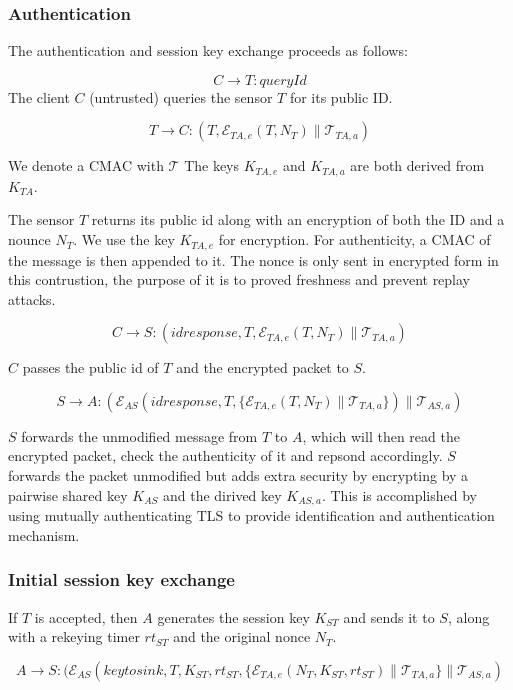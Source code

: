 \subsubsection{Authentication}

The authentication and session key exchange proceeds as follows:

\[
C \rightarrow T: \textit{queryId}
\]
The client $C$ (untrusted) queries the sensor $T$ for its public ID.


\[
T \rightarrow C: (T, \mathcal{E}_{TA,e}(T, N_T) \parallel \mathcal{T}_{TA,a})
\]

We denote a CMAC with $\mathcal{T}$ The keys $K_{TA,e}$ and $K_{TA,a}$
are both derived from $K_{TA}$.

The sensor $T$ returns its public id along with an encryption of both
the ID and a nounce $N_T$. We use the key $K_{TA,e}$ for
encryption. For authenticity, a CMAC of the message is then appended
to it. The nonce is only sent in encrypted form in this contrustion,
the purpose of it is to proved freshness and prevent replay attacks.

\[
C\rightarrow S: (idresponse,T,\mathcal{E}_{TA,e}(T,N_T) \parallel \mathcal{T}_{TA,a})
\]

$C$ passes the public id of $T$ and the encrypted packet to $S$.

\[
S \rightarrow A: (\mathcal{E}_{AS}(idresponse,T, \{
\mathcal{E}_{TA,e}(T,N_T) \parallel \mathcal{T}_{TA,a} \}) \parallel
\mathcal{T}_{AS,a})
\]

$S$ forwards the unmodified message from $T$ to $A$, which will then
read the encrypted packet, check the authenticity of it and repsond
accordingly. $S$ forwards the packet unmodified but adds extra security
by encrypting by a pairwise shared key $K_{AS}$ and the dirived key
$K_{AS,a}$. This is accomplished by using mutually authenticating TLS
to provide identification and authentication mechanism.

\subsubsection{Initial session key exchange}

If $T$ is accepted, then $A$ generates the session key $K_{ST}$ and
sends it to $S$, along with a rekeying timer $rt_{ST}$ and the
original nonce $N_T$.

\[
A \rightarrow S: (\mathcal{E}_{AS}(keytosink,T,K_{ST},rt_{ST}, \{
\mathcal{E}_{TA,e}(N_T,K_{ST},rt_{ST}) \parallel \mathcal{T}_{TA,a}
\} \parallel \mathcal{T}_{AS,a})
\]

